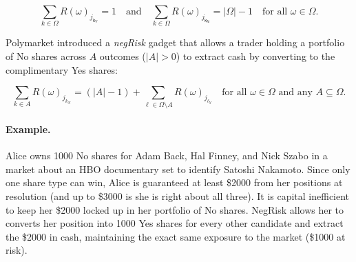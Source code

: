 \begin{equation}
\sum_{k\in\Omega} R(\omega)_{j_{\mathsf{k_Y}}}=1
\quad\text{and}\quad
\sum_{k\in\Omega} R(\omega)_{j_{\mathsf{k_N}}}=|\Omega|-1
\quad\text{for all }\omega\in\Omega.
\end{equation}



%
%

Polymarket introduced a \textit{negRisk} gadget that allows a trader holding a portfolio of No shares across $A$ outcomes ($|A|>0$) to extract cash by converting to the complimentary Yes shares:

\begin{equation}
\sum_{k\in A} R(\omega)_{j_{k_N}}
=
(|A|-1)
+
\sum_{\ell\in\Omega\setminus A} R(\omega)_{j_{\ell_Y}} 
\quad\text{for all }\omega\in\Omega\text{ and any }A\subseteq\Omega.
\end{equation}

\paragraph{Example.} Alice owns 1000 No shares for Adam Back, Hal Finney, and Nick Szabo in a market about an HBO documentary set to identify Satoshi Nakamoto. Since only one share type can win, Alice is guaranteed at least \$2000 from her positions at resolution (and up to \$3000 is she is right about all three). It is capital inefficient to keep her \$2000 locked up in her portfolio of No shares. NegRisk allows her to converts her position into 1000 Yes shares for every other candidate and extract the \$2000 in cash, maintaining the exact same exposure to the market (\$1000 at risk). 



